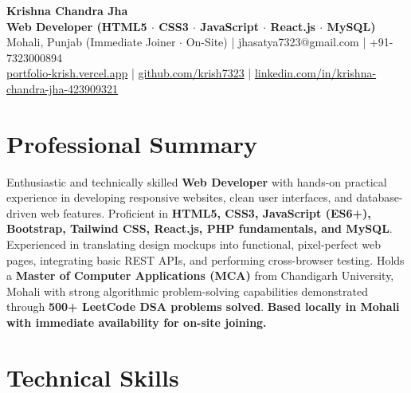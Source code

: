 \documentclass[a4paper,10pt]{article}
\begin{document}
\begin{center}

    {\LARGE \textbf{Krishna Chandra Jha}} \\[2.5pt]

    \textbf{Web Developer (HTML5 $\cdot$ CSS3 $\cdot$ JavaScript $\cdot$ React.js $\cdot$ MySQL)} \\[3.5pt]

    Mohali, Punjab (Immediate Joiner $\cdot$ On-Site)
    \quad | \quad
    jhasatya7323@gmail.com
    \quad | \quad
    +91-7323000894
    \\[2.5pt]

    \href{https://portfolio-ashen-alpha-dv0whhsamo.vercel.app/}{portfolio-krish.vercel.app}
    \quad | \quad
    \href{https://github.com/krish7323}{github.com/krish7323}
    \quad | \quad
    \href{https://linkedin.com/in/krishna-chandra-jha-423909321}
    {linkedin.com/in/krishna-chandra-jha-423909321}

\end{center}

\section*{Professional Summary}

Enthusiastic and technically skilled \textbf{Web Developer} with hands-on practical experience in developing responsive websites, clean user interfaces, and database-driven web features. Proficient in \textbf{HTML5, CSS3, JavaScript (ES6+), Bootstrap, Tailwind CSS, React.js, PHP fundamentals, and MySQL}. Experienced in translating design mockups into functional, pixel-perfect web pages, integrating basic REST APIs, and performing cross-browser testing. Holds a \textbf{Master of Computer Applications (MCA)} from Chandigarh University, Mohali with strong algorithmic problem-solving capabilities demonstrated through \textbf{500+ LeetCode DSA problems solved}. \textbf{Based locally in Mohali with immediate availability for on-site joining.}

\section*{Technical Skills}
\end{document}
